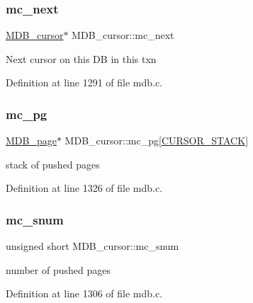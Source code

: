 \mbox{\label{struct_m_d_b__cursor_a411862030a3c01cf536ec202c88b5b18}} 
\subsubsection{\texorpdfstring{mc\+\_\+next}{mc\_next}}
{\footnotesize\ttfamily \mbox{\hyperlink{struct_m_d_b__cursor}{M\+D\+B\+\_\+cursor}}$\ast$ M\+D\+B\+\_\+cursor\+::mc\+\_\+next}

Next cursor on this DB in this txn 

Definition at line 1291 of file mdb.\+c.

\mbox{\label{struct_m_d_b__cursor_a38c7d46de8e44dd644ae28fb18e0eef0}} 
\subsubsection{\texorpdfstring{mc\+\_\+pg}{mc\_pg}}
{\footnotesize\ttfamily \mbox{\hyperlink{struct_m_d_b__page}{M\+D\+B\+\_\+page}}$\ast$ M\+D\+B\+\_\+cursor\+::mc\+\_\+pg\mbox{[}\mbox{\hyperlink{group__internal_gaef453f149efb721c2eb311a6ede48dc8}{C\+U\+R\+S\+O\+R\+\_\+\+S\+T\+A\+CK}}\mbox{]}}

stack of pushed pages 

Definition at line 1326 of file mdb.\+c.

\mbox{\label{struct_m_d_b__cursor_adb751d5d6cf4135650fa2af70ec85b2e}} 
\subsubsection{\texorpdfstring{mc\+\_\+snum}{mc\_snum}}
{\footnotesize\ttfamily unsigned short M\+D\+B\+\_\+cursor\+::mc\+\_\+snum}

number of pushed pages 

Definition at line 1306 of file mdb.\+c.

\mbox{\label{struct_m_d_b__cursor_a8c9f0954ac7f204e06c785b0b2b0a646}} 
